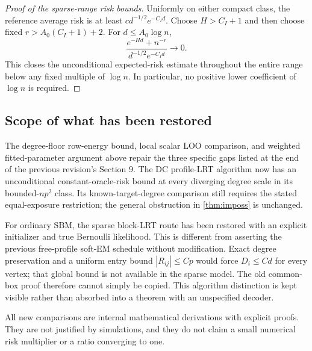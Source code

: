 \begin{proof}[Proof of the sparse-range risk bounds]
Uniformly on either compact class, the reference average risk is at
least $c d^{-1/2}e^{-C_Id}$. Choose $H>C_I+1$ and then choose fixed
$r>A_0(C_I+1)+2$. For $d\le A_0\log n$,
\[
 \frac{e^{-Hd}+n^{-r}}{d^{-1/2}e^{-C_Id}}\longrightarrow0.
\]
This closes the unconditional expected-risk estimate throughout the
entire range below any fixed multiple of $\log n$. In particular, no
positive lower coefficient of $\log n$ is required.
\end{proof}



\subsection{Scope of what has been restored}

The degree-floor row-energy bound, local scalar LOO comparison, and
weighted fitted-parameter argument above repair the three specific
gaps listed at the end of the previous revision's Section 9. The DC
profile-LRT algorithm now has an unconditional constant-oracle-risk
bound at every diverging degree scale in its bounded-$np^2$ class.
Its known-target-degree comparison still requires the stated
equal-exposure restriction; the general obstruction in
\cref{thm:imposs} is unchanged.

For ordinary SBM, the sparse block-LRT route has been restored with an
explicit initializer and true Bernoulli likelihood. This is different
from asserting the previous free-profile soft-EM schedule without
modification. Exact degree preservation and a uniform entry bound
$|R_{ij}|\le Cp$ would force $D_i\le Cd$ for every vertex; that global
bound is not available in the sparse model. The old common-box proof
therefore cannot simply be copied. This algorithm distinction is kept
visible rather than absorbed into a theorem with an unspecified decoder.

All new comparisons are internal mathematical derivations with explicit
proofs. They are not justified by simulations, and they do not claim a
small numerical risk multiplier or a ratio converging to one.

